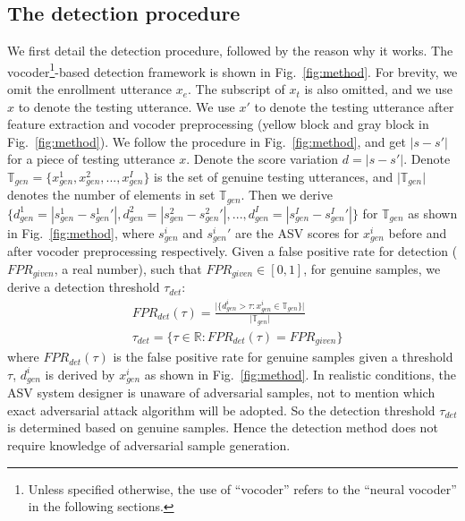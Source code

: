 \subsection{The detection procedure}
\label{subsec:vocoder based detection}
We first detail the detection procedure, followed by the reason why it works.
The vocoder\footnote[3]{Unless specified otherwise, the use of “vocoder” refers to the “neural vocoder” in the following sections.}-based detection framework is shown in Fig.~\ref{fig:method}.
For brevity, we omit the enrollment utterance $x_{e}$.
The subscript of $x_{t}$ is also omitted, and we use $x$ to denote the testing utterance.
We use $x'$ to denote the testing utterance after feature extraction and vocoder preprocessing (yellow block and gray block in Fig.~\ref{fig:method}).
We follow the procedure in Fig.~\ref{fig:method}, and get $|s-s'|$ for a piece of testing utterance $x$.
Denote the score variation $d=|s-s'|$.
Denote $\mathbb{T}_{gen} = \{x_{gen}^{1}, x_{gen}^{2},...,x_{gen}^{I}\}$ is the set of genuine testing utterances, and $\vert \mathbb{T}_{gen} \vert $ denotes the number of elements in set $\mathbb{T}_{gen}$.
Then we derive $\{d_{gen}^{1}=|s_{gen}^{1}-{s_{gen}^{1}}'|,d_{gen}^{2}=|s_{gen}^{2}-{s_{gen}^{2}}'|, ...,d_{gen}^{I}=|s_{gen}^{I}-{s_{gen}^{I}}'|\}$ for $\mathbb{T}_{gen}$ as shown in Fig.~\ref{fig:method}, where $s_{gen}^{i}$ and ${s_{gen}^{i}}'$ are the ASV scores for $x_{gen}^{i}$ before and after vocoder preprocessing respectively.
Given a false positive rate for detection ($FPR_{given}$, a real number), such that $FPR_{given} \in [0,1]$, for genuine samples, we derive a detection threshold $\tau_{det}$:
\begin{align}
    &FPR_{det}(\tau) = \frac{\vert \{ d_{gen}^{i} > \tau : x_{gen}^{i} \in \mathbb{T}_{gen} \} \vert}{\vert \mathbb{T}_{gen} \vert} \label{eq:det-far} \\
    &\tau_{det} = \{ \tau \in \mathbb{R} : FPR_{det}(\tau) =FPR_{given} \} \label{eq:det-threshold} 
\end{align}
where $FPR_{det}(\tau)$ is the false positive rate for genuine samples given a threshold $\tau$, $d_{gen}^{i}$ is derived by $x_{gen}^{i}$ as shown in Fig.~\ref{fig:method}.
In realistic conditions, the ASV system designer is unaware of adversarial samples, not to mention which exact adversarial attack algorithm will be adopted.
So the detection threshold $\tau_{det}$ is determined based on genuine samples.
Hence the detection method does not require knowledge of adversarial sample generation.

